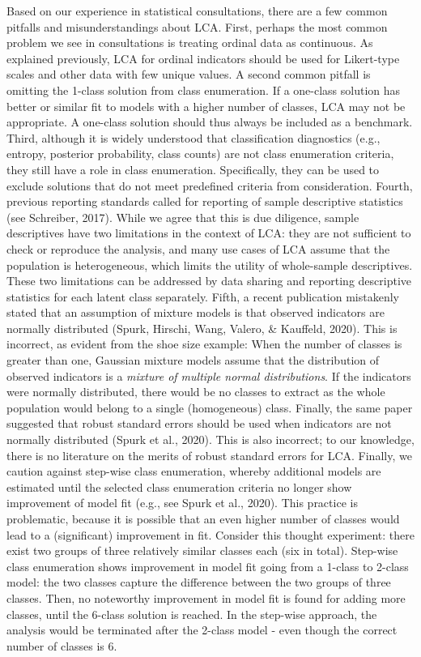 \documentclass[
  ,man,floatsintext]{apa6}
\begin{document}
Based on our experience in statistical consultations,
there are a few common pitfalls and misunderstandings about LCA.
First, perhaps the most common problem we see in consultations is treating ordinal data as continuous.
As explained previously, LCA for ordinal indicators should be used for Likert-type scales and other data with few unique values.
A second common pitfall is omitting the 1-class solution from class enumeration.
If a one-class solution has better or similar fit to models with a higher number of classes, LCA may not be appropriate.
A one-class solution should thus always be included as a benchmark.
Third, although it is widely understood that classification diagnostics (e.g., entropy, posterior probability, class counts) are not class enumeration criteria,
they still have a role in class enumeration.
Specifically, they can be used to exclude solutions that do not meet predefined criteria from consideration.
Fourth, previous reporting standards called for reporting of sample descriptive statistics (see Schreiber, 2017).
While we agree that this is due diligence,
sample descriptives have two limitations in the context of LCA:
they are not sufficient to check or reproduce the analysis,
and many use cases of LCA assume that the population is heterogeneous, which limits the utility of whole-sample descriptives.
These two limitations can be addressed by data sharing and reporting descriptive statistics for each latent class separately.
Fifth, a recent publication mistakenly stated that an assumption of mixture
models is that observed indicators are normally distributed
(Spurk, Hirschi, Wang, Valero, \& Kauffeld, 2020).
This is incorrect, as evident from the shoe size example:
When the number of classes is greater than one,
Gaussian mixture models assume that the distribution of observed indicators is a \emph{mixture of multiple normal distributions}.
If the indicators were normally distributed,
there would be no classes to extract as the whole population
would belong to a single (homogeneous) class.
Finally, the same paper suggested that robust standard errors
should be used when indicators are not normally distributed
(Spurk et al., 2020).
This is also incorrect;
to our knowledge, there is no literature on the merits of robust standard errors for LCA.
Finally, we caution against step-wise class enumeration,
whereby additional models are estimated until the selected class enumeration criteria no longer show improvement of model fit (e.g., see Spurk et al., 2020).
This practice is problematic,
because it is possible that an even higher number of classes would lead to a (significant) improvement in fit.
Consider this thought experiment: there exist two groups of three relatively similar classes each (six in total).
Step-wise class enumeration shows improvement in model fit going from a 1-class to 2-class model: the two classes capture the difference between the two groups of three classes.
Then, no noteworthy improvement in model fit is found for adding more classes, until the 6-class solution is reached.
In the step-wise approach, the analysis would be terminated after the 2-class model - even though the correct number of classes is 6.
\end{document}
